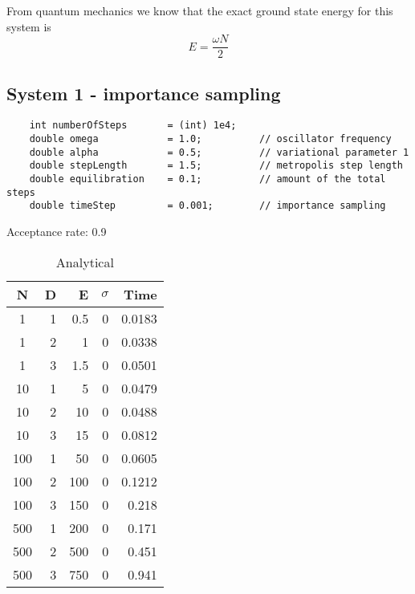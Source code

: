 \documentclass[english, a4paper]{article}
\begin{document}
From quantum mechanics we know that the exact ground state energy for this system is
\begin{equation}
 E = \frac{\omega N}{2}
\end{equation}


\subsection*{System 1 - importance sampling}

\begin{lstlisting}
    int numberOfSteps       = (int) 1e4;
    double omega            = 1.0;          // oscillator frequency
    double alpha            = 0.5;          // variational parameter 1
    double stepLength       = 1.5;          // metropolis step length
    double equilibration    = 0.1;          // amount of the total steps
    double timeStep         = 0.001;        // importance sampling
\end{lstlisting}

Acceptance rate: 0.9

\begin{table}[H]
  \centering
  \begin{tabular}{ | c | r | r | r | r |}
    \hline
    N& D& E& $\sigma$& Time \\*
    \hline
    1& 1& 0.5& 0& 0.0183 \\*
    \hline
    1& 2& 1& 0&  0.0338\\*
    \hline
    1& 3& 1.5& 0&  0.0501\\*
    \hline
    10& 1& 5& 0&  0.0479\\*
    \hline
    10& 2& 10& 0&  0.0488\\*
    \hline
    10& 3& 15& 0&  0.0812\\*
    \hline
    100& 1& 50& 0&  0.0605\\*
    \hline
    100& 2& 100& 0&  0.1212\\*
    \hline
    100& 3& 150& 0&  0.218\\*
    \hline
    500& 1& 200& 0&  0.171\\*
    \hline
    500& 2& 500& 0&  0.451\\*
    \hline
    500& 3& 750& 0&  0.941\\*
    \hline
  \end{tabular}
  \caption{Analytical}
  \label{tab:Tabell1}
\end{table}
\end{document}

